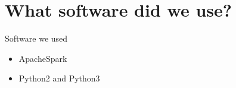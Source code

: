 \section{What software did we use?}
    
    \frame{\sectionpage}
    
    \begin{frame}{Software we used}
		\begin{itemize}
			\item ApacheSpark
			\pause
			\item Python2 and Python3
		\end{itemize}
	\end{frame}